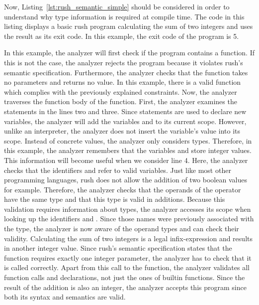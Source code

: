 Now, Listing~\ref{lst:rush_semantic_simple} should be considered in order to understand why type information is required at compile time.
The code in this listing displays a basic rush program calculating the sum of two integers and uses the result as its exit code.
In this example, the exit code of the program is 5.


In this example, the analyzer will first check if the program contains a  function.
If this is not the case, the analyzer rejects the program because it violates rush's semantic specification.
Furthermore, the analyzer checks that the  function takes no parameters and returns no value. In this
example, there is a valid  function which complies with the previously explained constraints. Now, the analyzer traverses the
function body of the  function. First, the analyzer examines the statements in the lines two and three.
Since  statements are used to declare
new variables, the analyzer will add the variables  and  to its
current scope. However, unlike an interpreter, the analyzer does not insert the
variable's value into its scope. Instead of concrete values, the analyzer
only considers types. Therefore, in this example, the
analyzer remembers that the variables  and  store integer values.
This information will become useful when we consider line 4. Here, the
analyzer checks that the identifiers  and  refer to valid variables.
Just like most other programming languages, rush does not allow the addition
of two boolean values for example. Therefore, the analyzer checks that the operands
of the \qVerb{+} operator have the same type and that this type is valid in additions. %
Because this validation requires information about types, the analyzer accesses
its scope when looking up the identifiers  and . Since those names
were previously associated with the  type, the analyzer is now aware of the
operand types and can check their validity. Calculating the
sum of two integers is a legal infix-expression and results in another integer value. Since rush's
semantic specification states that the  function requires exactly one
integer parameter, the analyzer has to check that it is called correctly.
Apart from this call to the  function, the analyzer validates all function calls and declarations, not
just the ones of builtin functions. Since the result of the addition is also an
integer, the analyzer accepts this program since both its syntax and semantics
are valid.

